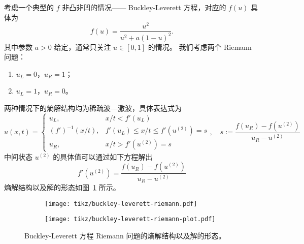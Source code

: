 \begin{example}
    考虑一个典型的 $f$ 非凸非凹的情况—— Buckley-Leverett 方程，对应的 $f(u)$ 具体为
    \[
        f(u) = \frac{u^2}{u^2 + a(1-u)^2}.
    \]
    其中参数 $a > 0$ 给定，通常只关注 $u \in [0,1]$ 的情况。
    我们考虑两个 Riemann 问题：
    \begin{enumerate}
        \item $u_L = 0$，$u_R = 1$；
        \item $u_L = 1$，$u_R = 0$。
    \end{enumerate}
    两种情况下的熵解结构均为稀疏波—激波，具体表达式为
    \[
        u(x,t) ={}
        \begin{cases}
            u_L,            & x/t < f'(u_L)                       \\
            (f')^{-1}(x/t), & f'(u_L) \le x/t \le f'(u^{(2)}) = s \\
            u_R,            & x/t > f'(u^{(2)}) = s
        \end{cases}
        ,\quad
        s := \frac{f(u_R) - f(u^{(2)})}{u_R - u^{(2)}}
    \]
    中间状态 $u^{(2)}$ 的具体值可以通过如下方程解出
    \[
        f'(u^{(2)}) = \frac{f(u_R) - f(u^{(2)})}{u_R - u^{(2)}}
    \]
    熵解结构以及解的形态如图~\ref{fig:buckley-leverett-riemann} 所示。
\end{example}

\begin{figure}[htbp]
    \centering
    \begin{subfigure}[b]{\textwidth}
        \centering
        \texttt{[image: tikz/buckley-leverett-riemann.pdf]}
    \end{subfigure}
    \begin{subfigure}[b]{\textwidth}
        \centering
        \texttt{[image: tikz/buckley-leverett-riemann-plot.pdf]}
    \end{subfigure}
    \caption{Buckley-Leverett 方程 Riemann 问题的熵解结构以及解的形态。} \label{fig:buckley-leverett-riemann}
\end{figure}


